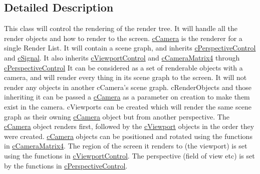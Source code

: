 \subsection{Detailed Description}
This class will control the rendering of the render tree. It will handle all the render objects and how to render to the screen. \hyperlink{classc_camera}{cCamera} is the renderer for a single Render List. It will contain a scene graph, and inherits \hyperlink{classc_perspective_control}{cPerspectiveControl} and \hyperlink{classc_signal}{cSignal}. It also inherits \hyperlink{classc_viewport_control}{cViewportControl} and \hyperlink{classc_camera_matrix4}{cCameraMatrix4} through \hyperlink{classc_perspective_control}{cPerspectiveControl} It can be considered as a set of renderable objects with a camera, and will render every thing in its scene graph to the screen. It will not render any objects in another cCamera's scene graph. cRenderObjects and those inheriting it can be passed a \hyperlink{classc_camera}{cCamera} as a parameter on creation to make them exist in the camera. cViewports can be created which will render the same scene graph as their owning \hyperlink{classc_camera}{cCamera} object but from another perspective. The \hyperlink{classc_camera}{cCamera} object renders first, followed by the \hyperlink{classc_viewport}{cViewport} objects in the order they were created. \hyperlink{classc_camera}{cCamera} objects can be positioned and rotated using the functions in \hyperlink{classc_camera_matrix4}{cCameraMatrix4}. The region of the screen it renders to (the viewport) is set using the functions in \hyperlink{classc_viewport_control}{cViewportControl}. The perspective (field of view etc) is set by the functions in \hyperlink{classc_perspective_control}{cPerspectiveControl}. 